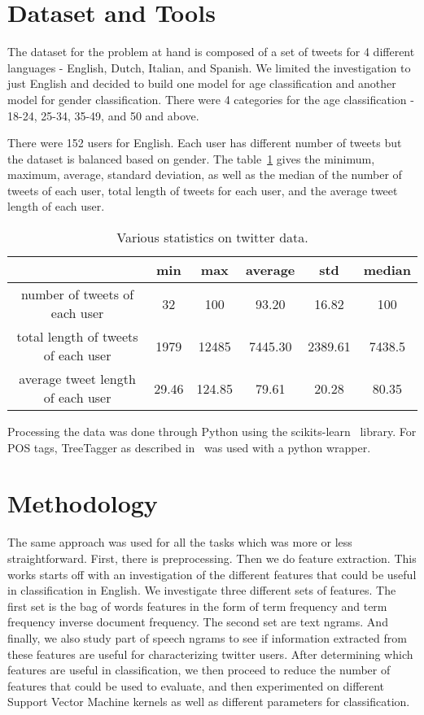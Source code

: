 \documentclass[a4paper]{llncs}
\begin{document}
\section{Dataset and Tools}
The dataset for the problem at hand is composed of a set of tweets for 4 different languages - English, Dutch, Italian, and Spanish. We limited the investigation to just English and decided to build one model for age classification and another model for gender classification. There were 4 categories for the age classification - 18-24, 25-34, 35-49, and 50 and above.

There were 152 users for English. Each user has different number of tweets but the dataset is balanced based on gender. The table~\ref{table:TweetStats} gives the minimum, maximum, average, standard deviation, as well as the median of the number of tweets of each user, total length of tweets for each user, and the average tweet length of each user. 

\begin{table}[!htbp]
\centering
\begin{tabular}{|c|c|c|c|c|c|}
\hline
                                    & min   & max    & average & std     & median \\ \hline
number of tweets of each user       & 32    & 100    & 93.20   & 16.82   & 100    \\ \hline
total length of tweets of each user & 1979  & 12485  & 7445.30 & 2389.61 & 7438.5 \\ \hline
average tweet length of each user   & 29.46 & 124.85 & 79.61   & 20.28   & 80.35  \\ \hline
\end{tabular}
\caption{Various statistics on twitter data.}
\label{table:TweetStats}
\end{table}

Processing the data was done through Python using the scikits-learn~\cite{scikit-learn} library. For POS tags, TreeTagger as described in~\cite{schmid1994probabilistic} was used with a python wrapper.
\section{Methodology}
The same approach was used for all the tasks which was more or less straightforward. First, there is preprocessing. Then we do feature extraction. This works starts off with an investigation of the different features that could be useful in classification in English. We investigate three different sets of features. The first set is the bag of words features in the form of term frequency and term frequency inverse document frequency. The second set are text ngrams. And finally, we also study part of speech ngrams to see if information extracted from these features are useful for characterizing twitter users. After determining which features are useful in classification, we then proceed to reduce the number of features that could be used to evaluate, and then experimented on different Support Vector Machine kernels as well as different parameters for classification.
\end{document}

